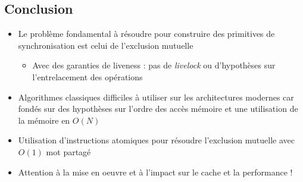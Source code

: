 \subsection{Conclusion}\label{conclusion}

\begin{itemize}
\tightlist
\item
  Le problème fondamental à résoudre pour construire des primitives de
  synchronisation est celui de l'exclusion mutuelle

  \begin{itemize}
  \tightlist
  \item
    Avec des garanties de liveness : pas de \emph{livelock} ou
    d'hypothèses sur l'entrelacement des opérations
  \end{itemize}
\item
  Algorithmes classiques difficiles à utiliser sur les architectures
  modernes car fondés sur des hypothèses sur l'ordre des accès mémoire
  et une utilisation de la mémoire en \(O(N)\)
\item
  Utilisation d'instructions atomiques pour résoudre l'exclusion
  mutuelle avec \(O(1)\) mot partagé
\item
  Attention à la mise en oeuvre et à l'impact sur le cache et la
  performance !
\end{itemize}

